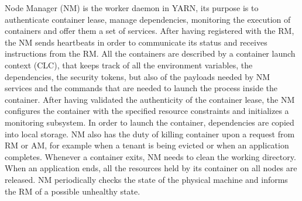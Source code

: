 Node Manager (NM) is the worker daemon in YARN, its purpose is to authenticate container lease, manage dependencies, monitoring the execution of containers and offer them a set of services. After having registered with the RM, the NM sends heartbeats in order to communicate its status and receives instructions from the RM. All the containers are described by a container launch context (CLC), that keeps track of all the environment variables, the dependencies, the security tokens, but also of the payloads needed by NM services and the commands that are needed to launch the process inside the container. After having validated the authenticity of the container lease, the NM configures the container with the specified resource constraints and initializes a monitoring subsystem. In order to launch the container, dependencies are copied into local storage. NM also has the duty of killing container upon a request from RM or AM, for example when a tenant is being evicted or when an application completes. Whenever a container exits, NM needs to clean the working directory. When an application ends, all the resources held by its container on all nodes are released. NM periodically checks the state of the physical machine and informs the RM of a possible unhealthy state.

